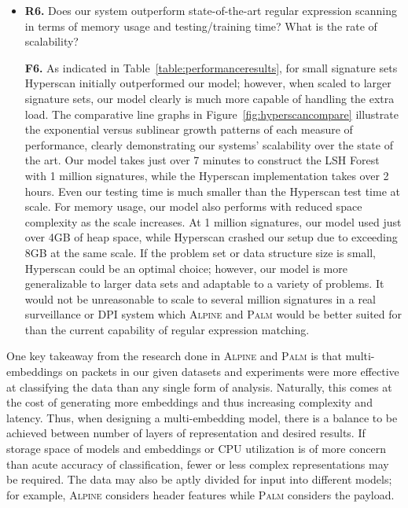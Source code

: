 \begin{itemize}
\item\textbf{R6.} Does our system outperform state-of-the-art regular expression scanning in terms of memory usage and testing/training time? What is the rate of scalability?

\textbf{F6.} As indicated in Table~\ref{table:performanceresults}, for small signature sets Hyperscan initially outperformed our model; however, when scaled to larger signature sets, our model clearly is much more capable of handling the extra load. The comparative line graphs in Figure~\ref{fig:hyperscancompare} illustrate the exponential versus sublinear growth patterns of each measure of performance, clearly demonstrating our systems' scalability over the state of the art. Our model takes just over 7 minutes to construct the LSH Forest with 1 million signatures, while the Hyperscan implementation takes over 2 hours. Even our testing time is much smaller than the Hyperscan test time at scale. For memory usage, our model also performs with reduced space complexity as the scale increases. At 1 million signatures, our model used just over 4GB of heap space, while Hyperscan crashed our setup due to exceeding 8GB at the same scale. If the problem set or data structure size is small, Hyperscan could be an optimal choice; however, our model is more generalizable to larger data sets and adaptable to a variety of problems. It would not be unreasonable to scale to several million signatures in a real surveillance or DPI system which \textsc{Alpine} and \textsc{Palm} would be better suited for than the current capability of regular expression matching.
\end{itemize}

One key takeaway from the research done in \textsc{Alpine} and \textsc{Palm} is that multi-embeddings on packets in our given datasets and experiments were more effective at classifying the data than any single form of analysis. Naturally, this comes at the cost of generating more embeddings and thus increasing complexity and latency. Thus, when designing a multi-embedding model, there is a balance to be achieved between number of layers of representation and desired results. If storage space of models and embeddings or CPU utilization is of more concern than acute accuracy of classification, fewer or less complex representations may be required. The data may also be aptly divided for input into different models; for example, \textsc{Alpine} considers header features while \textsc{Palm} considers the payload. 

